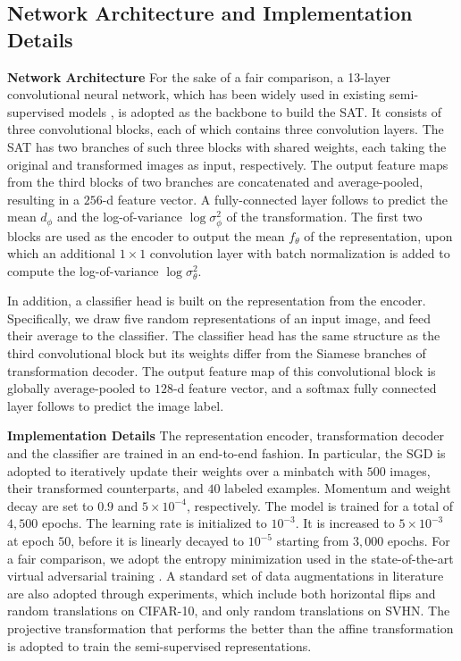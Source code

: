 \documentclass[10pt,journal,compsoc,twoside]{IEEEtran}
\begin{document}
\subsection{Network Architecture and Implementation Details}

{\bf\noindent Network Architecture} For the sake of a fair comparison, a 13-layer convolutional neural network, which has been widely used in existing semi-supervised models \cite{laine2016temporal,tarvainen2017mean,miyato2018virtual}, is adopted as the backbone to build the SAT. %
It consists of three convolutional blocks, each of which contains three convolution layers. The SAT has two branches of such three blocks with shared weights, each taking the original and transformed images as input, respectively. The output feature maps from the third blocks of two branches are concatenated and average-pooled, resulting in a $256$-d feature vector. A fully-connected layer follows to predict the mean $d_\phi$ and the log-of-variance $\log \sigma_\phi^2$ of the transformation.
The first two blocks are used as the encoder to output the mean $f_\theta$ of the representation, upon which an additional $1\times 1$ convolution layer with batch normalization is added to compute the log-of-variance $\log\sigma_\theta^2$.

In addition, a classifier head is built on the representation from the encoder. Specifically, we draw five random representations of an input image, and feed their average to the classifier. The classifier head has the same structure as the third convolutional block but its weights differ from the Siamese branches of transformation decoder. The output feature map of this convolutional block is globally average-pooled to $128$-d feature vector, and a softmax fully connected layer follows to predict the image label.

{\bf\noindent Implementation Details} The representation encoder, transformation decoder and the classifier are trained in an end-to-end fashion.
In particular, the SGD is adopted to iteratively update their weights over a minbatch with $500$ images, their transformed counterparts, and $40$ labeled examples. Momentum and weight decay are set to $0.9$ and $5\times 10^{-4}$, respectively. The model is trained for a total of $4,500$ epochs. The learning rate is initialized to $10^{-3}$. It is increased to $5\times 10^{-3}$ at epoch $50$, before it is linearly decayed to $10^{-5}$ starting from $3,000$ epochs.  For a fair comparison, we adopt the entropy minimization used in the state-of-the-art virtual adversarial training \cite{miyato2018virtual}. A standard set of data augmentations in literature \cite{laine2016temporal,tarvainen2017mean,miyato2018virtual} are also adopted through experiments, which include both horizontal flips and random translations on CIFAR-10, and only random translations on SVHN. The projective transformation that performs the better than the affine transformation is adopted to train the semi-supervised representations.
\end{document}

